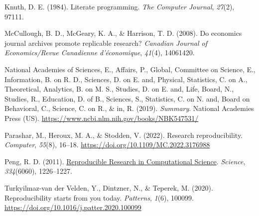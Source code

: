 \documentclass[
  a4paper,
]{article}
\newlength{\cslhangindent}
\newenvironment{CSLReferences}[2] %
 {\begin{list}{}{%
  \setlength{\itemindent}{0pt}
  \setlength{\leftmargin}{0pt}
  \setlength{\parsep}{0pt}
  \ifodd #1
   \setlength{\leftmargin}{\cslhangindent}
   \setlength{\itemindent}{-1\cslhangindent}
  \fi
  \setlength{\itemsep}{#2\baselineskip}}}
 {\end{list}}
\begin{document}
\begin{CSLReferences}{1}{0}
Knuth, D. E. (1984). Literate programming. \emph{The Computer Journal},
\emph{27}(2), 97111.

McCullough, B. D., McGeary, K. A., \& Harrison, T. D. (2008). Do
economics journal archives promote replicable research? \emph{Canadian
Journal of Economics/Revue Canadienne d'économique}, \emph{41}(4),
14061420.

National Academies of Sciences, E., Affairs, P., Global, Committee on
Science, E., Information, B. on R. D., Sciences, D. on E. and, Physical,
Statistics, C. on A., Theoretical, Analytics, B. on M. S., Studies, D.
on E. and, Life, Board, N., Studies, R., Education, D. of B., Sciences,
S., Statistics, C. on N. and, Board on Behavioral, C., Science, C. on
R., \& in, R. (2019). \emph{Summary}. National Academies Press (US).
\url{https://www.ncbi.nlm.nih.gov/books/NBK547531/}

Parashar, M., Heroux, M. A., \& Stodden, V. (2022). Research
reproducibility. \emph{Computer}, \emph{55}(8), 16--18.
\url{https://doi.org/10.1109/MC.2022.3176988}

Peng, R. D. (2011).
\href{https://www.ncbi.nlm.nih.gov/pubmed/22144613}{Reproducible
{Research} in {Computational Science}}. \emph{Science},
\emph{334}(6060), 1226--1227.

Turkyilmaz-van der Velden, Y., Dintzner, N., \& Teperek, M. (2020).
Reproducibility starts from you today. \emph{Patterns}, \emph{1}(6),
100099. \url{https://doi.org/10.1016/j.patter.2020.100099}

\end{CSLReferences}
\end{document}

